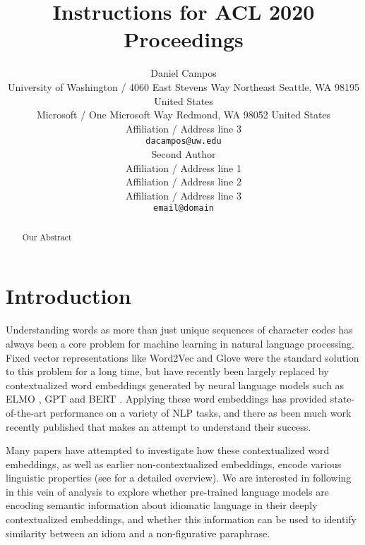 \documentclass[11pt,a4paper]{article}
\title{Instructions for ACL 2020 Proceedings}
\author{Daniel Campos \\
  University of Washington / 4060 East Stevens Way Northeast Seattle, WA 98195 United States \\
  Microsoft / One Microsoft Way Redmond, WA 98052 United States\\
  Affiliation / Address line 3 \\
  \texttt{dacampos@uw.edu} \\\And
  Second Author \\
  Affiliation / Address line 1 \\
  Affiliation / Address line 2 \\
  Affiliation / Address line 3 \\
  \texttt{email@domain} \\}
\date{}
\begin{document}
\maketitle
\begin{abstract}
Our Abstract
\end{abstract}
\section{Introduction}
Understanding words as more than just unique sequences of character codes has always been a core problem for machine learning in natural language processing. Fixed vector representations like Word2Vec \cite{Mikolov2013DistributedRO} and Glove \cite{Pennington2014GloveGV} were the standard solution to this problem for a long time, but have recently been largely replaced by contextualized word embeddings generated by neural language models such as  ELMO \cite{Peters2018DeepCW}, GPT \cite{Radford2018ImprovingLU} and BERT \cite{Devlin2019BERTPO}. Applying these word embeddings has provided state-of-the-art performance on a variety of NLP tasks, and there as been much work recently published that makes an attempt to understand their success. 

Many papers have attempted to investigate how these contextualized word embeddings, as well as earlier non-contextualized embeddings, encode various linguistic properties (see \citet{Belinkov_2019} for a detailed overview). We are interested in following in this vein of analysis to explore whether pre-trained language models are encoding semantic information about idiomatic language in their deeply contextualized embeddings, and whether this information can be used to identify similarity between an idiom and a non-figurative paraphrase.
\end{document}
